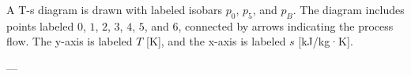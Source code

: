 A T-s diagram is drawn with labeled isobars \( p_0 \), \( p_5 \), and \( p_B \). The diagram includes points labeled \( 0 \), \( 1 \), \( 2 \), \( 3 \), \( 4 \), \( 5 \), and \( 6 \), connected by arrows indicating the process flow. The y-axis is labeled \( T \) [K], and the x-axis is labeled \( s \) [kJ/kg·K].

---